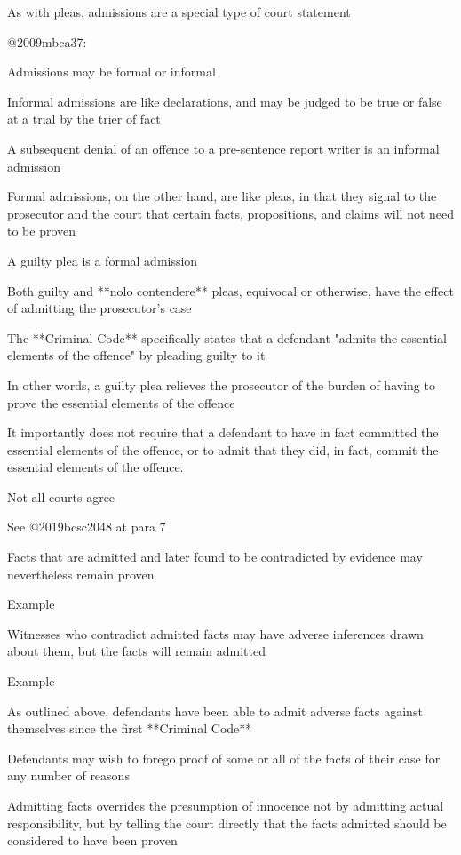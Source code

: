 As with pleas, admissions are a special type of court statement

@2009mbca37:

Admissions may be formal or informal

Informal admissions are like declarations, and may be judged to be true or false at a trial by the trier of fact

A subsequent denial of an offence to a pre-sentence report writer is an informal admission

Formal admissions, on the other hand, are like pleas, in that they signal to the prosecutor and the court that certain facts, propositions, and claims will not need to be proven

A guilty plea is a formal admission

Both guilty and **nolo contendere** pleas, equivocal or otherwise, have the effect of admitting the prosecutor's case

The **Criminal Code** specifically states that a defendant "admits the essential elements of the offence" by pleading guilty to it

In other words, a guilty plea relieves the prosecutor of the burden of having to prove the essential elements of the offence

It importantly does not require that a defendant to have in fact committed the essential elements of the offence, or to admit that they did, in fact, commit the essential elements of the offence.

Not all courts agree

See @2019bcsc2048 at para 7

Facts that are admitted and later found to be contradicted by evidence may nevertheless remain proven

Example

Witnesses who contradict admitted facts may have adverse inferences drawn about them, but the facts will remain admitted

Example

As outlined above, defendants have been able to admit adverse facts against themselves since the first **Criminal Code**

Defendants may wish to forego proof of some or all of the facts of their case for any number of reasons

Admitting facts overrides the presumption of innocence not by admitting actual responsibility, but by telling the court directly that the facts admitted should be considered to have been proven

